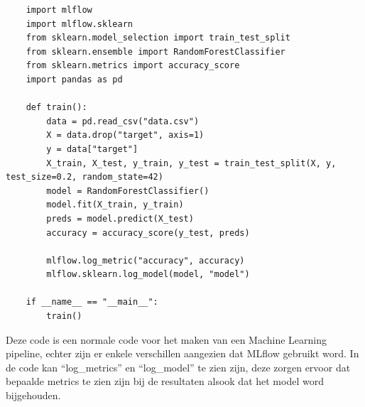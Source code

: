 
\begin{verbatim}
    import mlflow
    import mlflow.sklearn
    from sklearn.model_selection import train_test_split
    from sklearn.ensemble import RandomForestClassifier
    from sklearn.metrics import accuracy_score
    import pandas as pd
    
    def train():
        data = pd.read_csv("data.csv")
        X = data.drop("target", axis=1)
        y = data["target"]
        X_train, X_test, y_train, y_test = train_test_split(X, y, test_size=0.2, random_state=42)
        model = RandomForestClassifier()
        model.fit(X_train, y_train)
        preds = model.predict(X_test)
        accuracy = accuracy_score(y_test, preds)
        
        mlflow.log_metric("accuracy", accuracy)
        mlflow.sklearn.log_model(model, "model")
    
    if __name__ == "__main__":
        train()
\end{verbatim}
Deze code is een normale code voor het maken van een Machine Learning pipeline, echter zijn er enkele verschillen aangezien dat MLflow gebruikt word.
In de code kan ``log_metrics'' en ``log_model'' te zien zijn, deze zorgen ervoor dat bepaalde metrics te zien zijn bij de resultaten alsook dat het model word bijgehouden.
